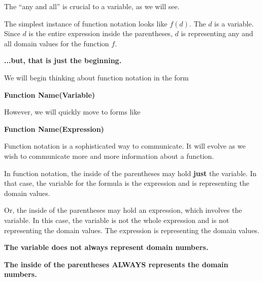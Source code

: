 \documentclass{ximera}
\begin{document}
The ``any and all'' is crucial to a variable, as we will see. 


The simplest instance of function notation looks like $f(d)$.  The $d$ is a variable.  Since $d$ is the entire expression inside the parentheses, $d$ is representing any and all domain values for the function $f$.

\textbf{\textcolor{red!70!black}{...but, that is just the beginning.}} 









We will begin thinking about function notation in the form 

\begin{center}

\textbf{\textcolor{blue!55!black}{Function Name(Variable)}}

\end{center}


However, we will quickly move to forms like


\begin{center}

\textbf{\textcolor{blue!55!black}{Function Name(Expression)}}

\end{center}




Function notation is a sophisticated way to communicate.  It will evolve as we wish to communicate more and more information about a function. 

In function notation, the inside of the parentheses may hold \textbf{just} the variable.  In that case, the variable for the formula is the expression and is representing the domain values. 

Or, the inside of the parentheses may hold an expression, which involves the variable.  In this case, the variable is not the whole expression and is not representing the domain values. The expression is representing the domain values.


 
\begin{center}

\textbf{\textcolor{blue!55!black}{The variable does not always represent domain numbers.}} 

\textbf{\textcolor{purple!85!blue}{The inside of the parentheses ALWAYS represents the domain numbers.}}


\end{center}
\end{document}
